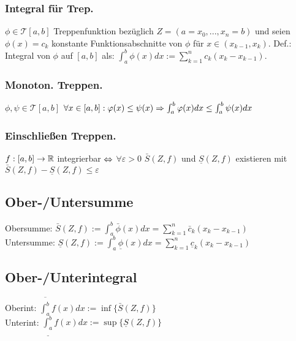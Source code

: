 \subsubsection*{Integral für Trep.}
$\phi \in \mathcal{T}[a,b]$ Treppenfunktion bezüglich $Z = (a = x_0, ..., x_n = b)$ und seien $\phi(x) = c_k$ konstante Funktionsabschnitte von $\phi$ für $x \in (x_{k-1}, x_k)$. Def.: Integral von $\phi$ auf $[a, b]$ als: $\int_{a}^b \phi(x) dx := \sum_{k = 1}^n c_k (x_k - x_{k - 1})$.
\subsubsection*{Monoton. Treppen.}
$\phi, \psi \in \mathcal{T}[a, b]$ $\forall x \in [a, b]: \varphi(x) \leq \psi(x) \Rightarrow \int_{a}^b \varphi(x) dx \leq \int_a^b \psi(x) dx$
\subsubsection*{Einschließen Treppen.}
$f:[a, b] \rightarrow \mathbb R$ integrierbar $\Leftrightarrow$ $\forall \varepsilon > 0$ $\bar S(Z, f)$ und $\underline{S}(Z, f)$ existieren mit $\bar S (Z, f) - \underline{S}(Z, f) \leq \varepsilon$
\subsection*{Ober-/Untersumme}
Obersumme: $\bar S(Z, f) := \int_a^b \bar \phi(x) dx = \sum_{k = 1}^n \bar c_k (x_k - x_{k - 1})$\\
Untersumme: $\underline{S}(Z, f) := \int_a^b \underline{\phi}(x) dx = \sum_{k = 1}^n \underline{c}_k (x_k - x_{k -1})$
\subsection*{Ober-/Unterintegral}
Oberint: $\overline{\int_a^b} f(x) dx := \inf \{\bar S(Z, f)\}$\\
Unterint: $\underline{\int_a^b}f(x) dx := \sup \{\underline{S}(Z, f)\}$
